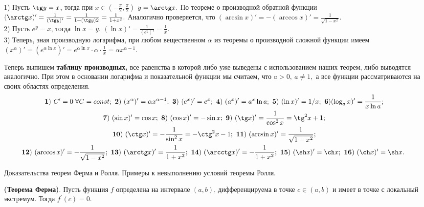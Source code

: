 \begin{example}
    1) Пусть $\tg y=x$, тогда
    при $x\in\left(-\frac{\pi}{2},
        \frac{\pi}{2}\right)$ $y=\arctg x.$
    По теореме о производной обратной
    функции $(\arctg x)'=\frac{1}
        {(\tg y)'}=\frac{1}{1+(\tg y)2}=
        \frac{1}{1+x^2}.$
    Аналогично проверяется, что
    $(\arcsin x)'=-(\arccos x)'=
        \frac{1}{\sqrt{1-x^2}}.$\\
    2) Пусть $e^y=x$, тогда
    $\ln x=y.$ $(\ln x)'=
        \frac{1}{(e^y)'}=
        \frac{1}{x}.$\\
    3) Теперь, зная производную логарифма,
    при любом вещественном $\alpha$ из
    теоремы о производной сложной функции
    имеем $(x^{\alpha})'=
        (e^{\alpha\ln x})'=
        e^{\alpha\ln x}\cdot\alpha
        \cdot\frac{1}{x}=\alpha x^{\alpha-1}.$
\end{example}
Теперь выпишем \textbf{таблицу производных,}
все равенства в которой либо уже выведены
с использованием наших теорем, либо
выводятся аналогично. При этом в основании
логарифма и показательной функции мы считаем,
что $a>0, \ a\neq1,$ а все функции рассматриваются
на своих областях определения.
\begin{multline*}
    {\bf 1)} \ C'=0\;\forall C=const; \ {\bf 2)} \ (x^{\alpha})'=
    \alpha x^{\alpha-1}; \ {\bf 3)} \ (e^x)'=e^x; \ {\bf 4)} \ (a^x)'=
    a^x\ln a; \ {\bf 5)} \ (\ln x)'=1/x;\
    {\bf 6)} (\log_a x)'=
    \frac{1}{x\ln a}; \\ {\bf 7)} \ (\sin x)'=\cos x; \
    {\bf 8)} \ (\cos x)'=-\sin x; \ {\bf 9)} \ (\tg x)'=
    \frac{1}{\cos^2x}=\tg^2x+1;\\
    {\bf 10)} \ (\ctg x)'=-\frac{1}{\sin^2x}=-\ctg^2x-1; \
    {\bf 11)} \ (\arcsin x)'=\frac{1}{\sqrt{1-x^2}}; \\
    {\bf 12)} \ (\arccos x)'=-\frac{1}{\sqrt{1-x^2}}; \
    {\bf 13)} \ (\arctg x)'=\frac{1}{1+x^2}; \
    {\bf 14)} \ (\arcctg x)'=-\frac{1}{1+x^2}; \
    {\bf 15)} \ (\sh x)'=\ch x; \
    {\bf 16)} \ (\ch x)'=\sh x. \
\end{multline*}
\newpage

\begin{problem}
Доказательства теорем Ферма и Ролля. Примеры к невыполнению условий теоремы
Ролля.
\end{problem}
\begin{theorem} \textbf{(Теорема Ферма)}.
    Пусть функция $f$ определена на интервале $(a, b)$, дифференцируема в точке $c \in(a, b)$ и имеет в точке с локальный экстремум. Тогда $f^{\prime}(c)=0$.
\end{theorem}


